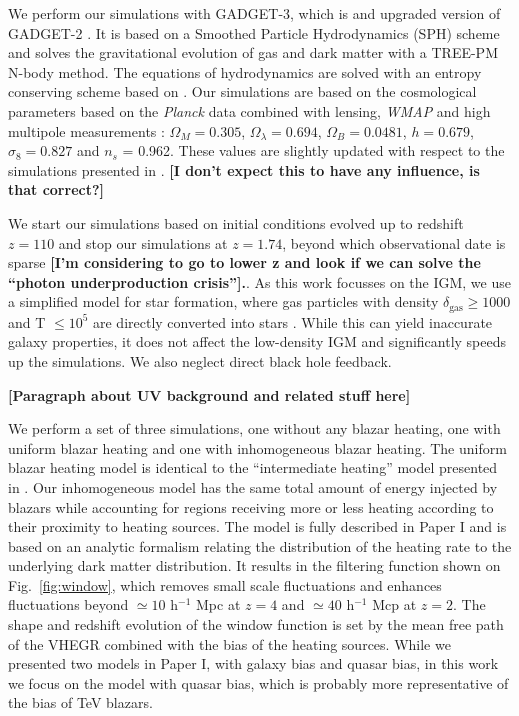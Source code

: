\documentclass[numberedappendix]{emulateapj}
\newcommand\ALc[1]{{\color{red} \bf #1}} %
\begin{document}
We perform our simulations with \textsc{GADGET-3}, which is and upgraded version of \textsc{GADGET-2} \citep{2005MNRAS.364.1105}.  It is based on a Smoothed Particle Hydrodynamics (SPH) scheme and solves the gravitational evolution of gas and dark matter with a TREE-PM N-body method.  The equations of hydrodynamics are solved with an entropy conserving scheme based on \citep{2002MNRAS.333..649S}.   Our simulations are based on the cosmological parameters based on  the \textit{Planck} data combined with lensing, \textit{WMAP} and high multipole measurements \citep{2014A&A...571A..16P}: $\Omega_M = 0.305$, $\Omega_{\lambda} = 0.694$, $\Omega_B = 0.0481$, $h = 0.679$, $\sigma_8 = 0.827$ and $n_s$ = 0.962.  These values are slightly updated with respect to the simulations presented in \citep{2012MNRAS.423..149P,2015ApJ...811...19L}. \ALc{[I don't expect this to have any influence, is that correct?]}

We start our simulations based on initial conditions evolved up to redshift $z=110$ and stop our simulations at $z=1.74$, beyond which observational date is sparse \ALc{[I'm considering to go to lower z and look if we can solve the ``photon underproduction crisis''].}. As this work focusses on the IGM, we use a simplified model for star formation, where gas particles with  density $\delta_{\mathrm{gas}}\geq 1000$ and T $\leq 10^5$ are directly converted into stars \citep{2004MNRAS.354..684V}. While this can yield inaccurate galaxy properties, it does not affect the low-density IGM and significantly speeds up the simulations. We also neglect direct black hole feedback.


\ALc{[Paragraph about UV  background and related stuff here]}

We perform a set of three simulations, one without any blazar heating, one with uniform blazar heating and one with inhomogeneous blazar heating.  The uniform blazar heating model is identical to the ``intermediate heating'' model presented in \citet{2012MNRAS.423..149P}.  Our inhomogeneous model has the same total amount of energy injected by blazars while accounting for regions receiving more or less heating according to their proximity to heating sources. The model is fully described in Paper I  and is based on an analytic formalism relating the distribution of the heating rate to the underlying dark matter distribution. It results in the  filtering function shown on Fig.~\ref{fig:window}, which  removes small scale fluctuations and enhances fluctuations beyond $\simeq 10$ h$^{-1}$ Mpc at $z=4$ and $\simeq 40$ h$^{-1}$ Mcp at $z=2$.  The shape and redshift evolution of the  window function is set by the mean free path of the VHEGR combined with the bias of the heating sources.  While we presented two models in Paper I, with galaxy bias and quasar bias, in this work we focus on the model with quasar bias, which is probably more representative of the bias of TeV blazars.  
\end{document}
